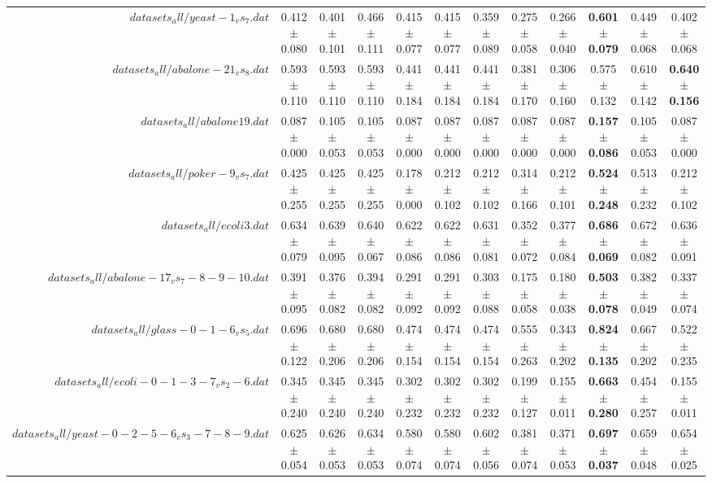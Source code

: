 \begin{table}[!ht]
{\begin{tabular}{r c c c c c c c c c c c}
$datasets_all/yeast-1_vs_7.dat$ & 0.412 $\pm$ 0.080 & 0.401 $\pm$ 0.101 & 0.466 $\pm$ 0.111 & 0.415 $\pm$ 0.077 & 0.415 $\pm$ 0.077 & 0.359 $\pm$ 0.089 & 0.275 $\pm$ 0.058 & 0.266 $\pm$ 0.040 & \textbf{0.601 $\pm$ 0.079} & 0.449 $\pm$ 0.068 & 0.402 $\pm$ 0.068 \\
$datasets_all/abalone-21_vs_8.dat$ & 0.593 $\pm$ 0.110 & 0.593 $\pm$ 0.110 & 0.593 $\pm$ 0.110 & 0.441 $\pm$ 0.184 & 0.441 $\pm$ 0.184 & 0.441 $\pm$ 0.184 & 0.381 $\pm$ 0.170 & 0.306 $\pm$ 0.160 & 0.575 $\pm$ 0.132 & 0.610 $\pm$ 0.142 & \textbf{0.640 $\pm$ 0.156} \\
$datasets_all/abalone19.dat$ & 0.087 $\pm$ 0.000 & 0.105 $\pm$ 0.053 & 0.105 $\pm$ 0.053 & 0.087 $\pm$ 0.000 & 0.087 $\pm$ 0.000 & 0.087 $\pm$ 0.000 & 0.087 $\pm$ 0.000 & 0.087 $\pm$ 0.000 & \textbf{0.157 $\pm$ 0.086} & 0.105 $\pm$ 0.053 & 0.087 $\pm$ 0.000 \\
$datasets_all/poker-9_vs_7.dat$ & 0.425 $\pm$ 0.255 & 0.425 $\pm$ 0.255 & 0.425 $\pm$ 0.255 & 0.178 $\pm$ 0.000 & 0.212 $\pm$ 0.102 & 0.212 $\pm$ 0.102 & 0.314 $\pm$ 0.166 & 0.212 $\pm$ 0.101 & \textbf{0.524 $\pm$ 0.248} & 0.513 $\pm$ 0.232 & 0.212 $\pm$ 0.102 \\
$datasets_all/ecoli3.dat$ & 0.634 $\pm$ 0.079 & 0.639 $\pm$ 0.095 & 0.640 $\pm$ 0.067 & 0.622 $\pm$ 0.086 & 0.622 $\pm$ 0.086 & 0.631 $\pm$ 0.081 & 0.352 $\pm$ 0.072 & 0.377 $\pm$ 0.084 & \textbf{0.686 $\pm$ 0.069} & 0.672 $\pm$ 0.082 & 0.636 $\pm$ 0.091 \\
$datasets_all/abalone-17_vs_7-8-9-10.dat$ & 0.391 $\pm$ 0.095 & 0.376 $\pm$ 0.082 & 0.394 $\pm$ 0.082 & 0.291 $\pm$ 0.092 & 0.291 $\pm$ 0.092 & 0.303 $\pm$ 0.088 & 0.175 $\pm$ 0.058 & 0.180 $\pm$ 0.038 & \textbf{0.503 $\pm$ 0.078} & 0.382 $\pm$ 0.049 & 0.337 $\pm$ 0.074 \\
$datasets_all/glass-0-1-6_vs_5.dat$ & 0.696 $\pm$ 0.122 & 0.680 $\pm$ 0.206 & 0.680 $\pm$ 0.206 & 0.474 $\pm$ 0.154 & 0.474 $\pm$ 0.154 & 0.474 $\pm$ 0.154 & 0.555 $\pm$ 0.263 & 0.343 $\pm$ 0.202 & \textbf{0.824 $\pm$ 0.135} & 0.667 $\pm$ 0.202 & 0.522 $\pm$ 0.235 \\
$datasets_all/ecoli-0-1-3-7_vs_2-6.dat$ & 0.345 $\pm$ 0.240 & 0.345 $\pm$ 0.240 & 0.345 $\pm$ 0.240 & 0.302 $\pm$ 0.232 & 0.302 $\pm$ 0.232 & 0.302 $\pm$ 0.232 & 0.199 $\pm$ 0.127 & 0.155 $\pm$ 0.011 & \textbf{0.663 $\pm$ 0.280} & 0.454 $\pm$ 0.257 & 0.155 $\pm$ 0.011 \\
$datasets_all/yeast-0-2-5-6_vs_3-7-8-9.dat$ & 0.625 $\pm$ 0.054 & 0.626 $\pm$ 0.053 & 0.634 $\pm$ 0.053 & 0.580 $\pm$ 0.074 & 0.580 $\pm$ 0.074 & 0.602 $\pm$ 0.056 & 0.381 $\pm$ 0.074 & 0.371 $\pm$ 0.053 & \textbf{0.697 $\pm$ 0.037} & 0.659 $\pm$ 0.048 & 0.654 $\pm$ 0.025 \\

\end{tabular}}
\end{table}
